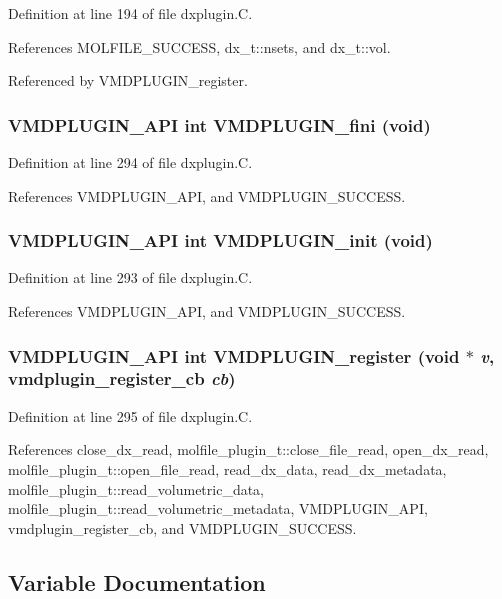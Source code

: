 Definition at line 194 of file dxplugin.C.

References MOLFILE\_\-SUCCESS, dx\_\-t::nsets, and dx\_\-t::vol.

Referenced by VMDPLUGIN\_\-register.
\subsubsection{\setlength{\rightskip}{0pt plus 5cm}VMDPLUGIN\_\-API int VMDPLUGIN\_\-fini (void)}\label{dxplugin_8C_a8}




Definition at line 294 of file dxplugin.C.

References VMDPLUGIN\_\-API, and VMDPLUGIN\_\-SUCCESS.
\subsubsection{\setlength{\rightskip}{0pt plus 5cm}VMDPLUGIN\_\-API int VMDPLUGIN\_\-init (void)}\label{dxplugin_8C_a7}




Definition at line 293 of file dxplugin.C.

References VMDPLUGIN\_\-API, and VMDPLUGIN\_\-SUCCESS.
\subsubsection{\setlength{\rightskip}{0pt plus 5cm}VMDPLUGIN\_\-API int VMDPLUGIN\_\-register (void $\ast$ {\em v}, {\bf vmdplugin\_\-register\_\-cb} {\em cb})}\label{dxplugin_8C_a9}




Definition at line 295 of file dxplugin.C.

References close\_\-dx\_\-read, molfile\_\-plugin\_\-t::close\_\-file\_\-read, open\_\-dx\_\-read, molfile\_\-plugin\_\-t::open\_\-file\_\-read, read\_\-dx\_\-data, read\_\-dx\_\-metadata, molfile\_\-plugin\_\-t::read\_\-volumetric\_\-data, molfile\_\-plugin\_\-t::read\_\-volumetric\_\-metadata, VMDPLUGIN\_\-API, vmdplugin\_\-register\_\-cb, and VMDPLUGIN\_\-SUCCESS.

\subsection{Variable Documentation}
